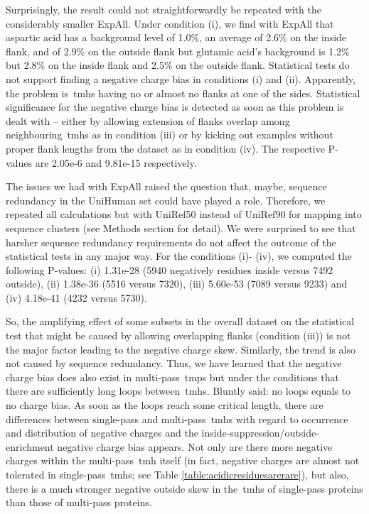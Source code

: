 Surprisingly, the result could not straightforwardly be repeated with the considerably smaller ExpAll.
Under condition (i), we find with ExpAll that aspartic acid has a background level of 1.0\%, an average of 2.6\% on the inside flank, and of 2.9\% on the outside flank but glutamic acid’s background is 1.2\% but 2.8\% on the inside flank and 2.5\% on the outside flank.
Statistical tests do not support finding a negative charge bias in conditions (i) and (ii).
Apparently, the problem is~\gls{tmh}s having no or almost no flanks at one of the sides.
Statistical significance for the negative charge bias is detected as soon as this problem is dealt with – either by allowing extension of flanks overlap among neighbouring~\gls{tmh}s as in condition (iii) or by kicking out examples without proper flank lengths from the dataset as in condition (iv).
The respective P\--values are 2.05e-6 and 9.81e-15 respectively.

The issues we had with ExpAll raised the question that, maybe, sequence redundancy in the UniHuman set could have played a role.
Therefore, we repeated all calculations but with UniRef50 instead of UniRef90 for mapping into sequence clusters (see Methods section for detail).
We were surprised to see that harsher sequence redundancy requirements do not affect the outcome of the statistical tests in any major way.
For the conditions (i)- (iv), we computed the following P\--values: (i) 1.31e-28 (5940 negatively residues inside versus 7492 outside), (ii) 1.38e-36 (5516 versus 7320), (iii) 5.60e-53 (7089 versus 9233) and (iv) 4.18e-41 (4232 versus 5730).

So, the amplifying effect of some subsets in the overall dataset on the statistical test that might be caused by allowing overlapping flanks (condition (iii)) is not the major factor leading to the negative charge skew.
Similarly, the trend is also not caused by sequence redundancy.
Thus, we have learned that the negative charge bias does also exist in multi-pass~\gls{tmp}s but under the conditions that there are sufficiently long loops between~\gls{tmh}s.
Bluntly said: no loops equals to no charge bias.
As soon as the loops reach some critical length, there are differences between single-pass and multi-pass~\gls{tmh}s with regard to occurrence and distribution of negative charges and the inside-suppression/outside-enrichment negative charge bias appears.
Not only are there more negative charges within the multi-pass~\gls{tmh} itself (in fact, negative charges are almost not tolerated in single-pass~\gls{tmh}s; see Table \ref{table:acidicresiduesarerare}), but also, there is a much stronger negative outside skew in the~\gls{tmh}s of single-pass proteins than those of multi-pass proteins.

